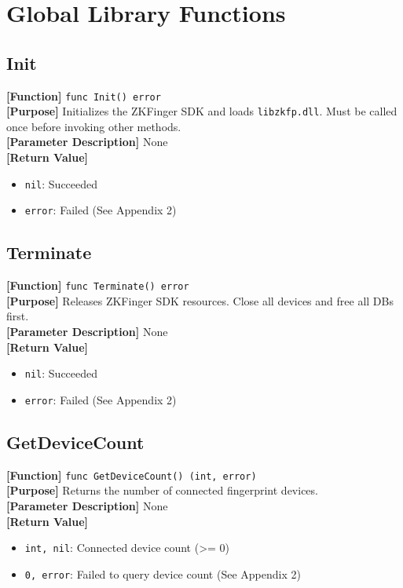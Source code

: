 \documentclass[11pt, a4paper]{article}
\begin{document}
\section{Global Library Functions}

\subsection{Init}
\textbf{[Function]} \texttt{func Init() error} \\
\textbf{[Purpose]} Initializes the ZKFinger SDK and loads \texttt{libzkfp.dll}. Must be called once before invoking other methods. \\
\textbf{[Parameter Description]} None \\
\textbf{[Return Value]} 
\begin{itemize}
    \item \texttt{nil}: Succeeded
    \item \texttt{error}: Failed (See Appendix 2)
\end{itemize}

\subsection{Terminate}
\textbf{[Function]} \texttt{func Terminate() error} \\
\textbf{[Purpose]} Releases ZKFinger SDK resources. Close all devices and free all DBs first. \\
\textbf{[Parameter Description]} None \\
\textbf{[Return Value]} 
\begin{itemize}
    \item \texttt{nil}: Succeeded
    \item \texttt{error}: Failed (See Appendix 2)
\end{itemize}

\subsection{GetDeviceCount}
\textbf{[Function]} \texttt{func GetDeviceCount() (int, error)} \\
\textbf{[Purpose]} Returns the number of connected fingerprint devices. \\
\textbf{[Parameter Description]} None \\
\textbf{[Return Value]} 
\begin{itemize}
    \item \texttt{int, nil}: Connected device count (>= 0)
    \item \texttt{0, error}: Failed to query device count (See Appendix 2)
\end{itemize}
\end{document}
